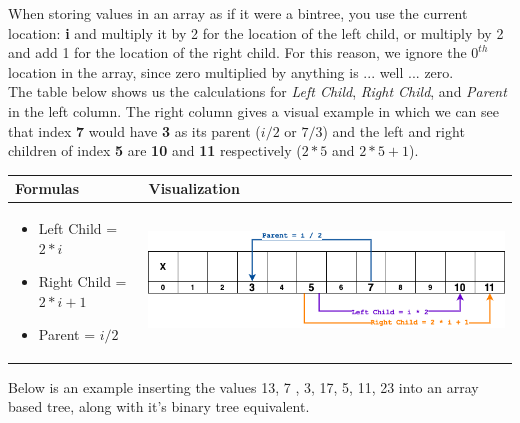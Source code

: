 \newpage
{}\label{abbst}\hypertarget{abbst}{}

When storing values in an array as if it were a \gls{bintree}, you use the current location: \textbf{i} and multiply it by 2 for the location of the left child, or multiply by 2 and add 1 for the location of the right child. For this reason, we ignore the $0^{th}$ location in the array, since zero multiplied by anything is ... well ... zero. \\

The table below shows us the calculations for \textit{Left Child}, \textit{Right Child}, and \textit{Parent} in the left column. The right column gives a visual example in which we can see that index \textbf{7} would have \textbf{3} as its parent ($i/2$ or $7/3$) and the left and right children of index \textbf{5} are \textbf{10} and \textbf{11} respectively ($2*5$ and $2*5+1$).


\begin{center}
\begin{tabular}{|M{0.30\textwidth}|M{0.60\textwidth}|}
\hline
\textbf{Formulas} & \textbf{Visualization}\\
\hline
\begin{itemize}
\tightlist
\item Left Child \hspace{4.5mm}= $2 * i$
\item Right Child  \hspace{2mm}= $2 * i + 1$
\item Parent \hspace{1cm}= $i / 2$
\end{itemize}&
\includegraphics[scale=.4]{images/binary_tree_array_traversing.png} \\
\hline
\end{tabular}
\end{center}

Below is an example inserting the values 13, 7 , 3, 17, 5, 11, 23 into an array based tree, along with it's binary tree equivalent. 

